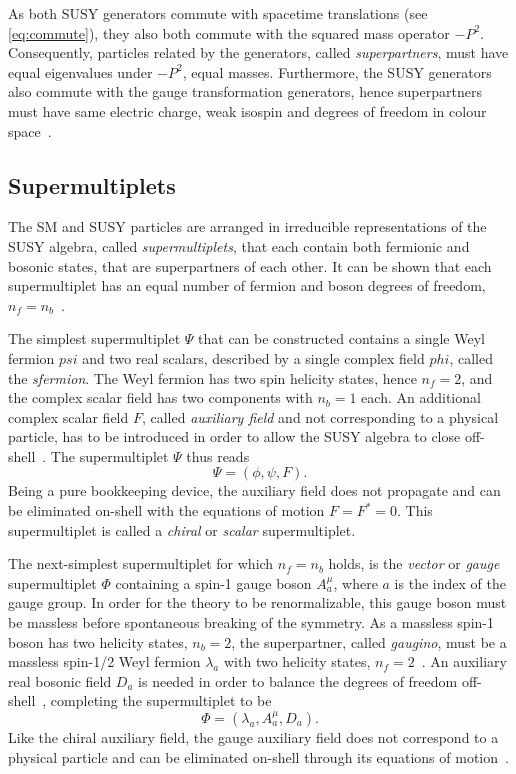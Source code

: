 As both SUSY generators commute with spacetime translations (see \cref{eq:commute}), they also both commute with the squared mass operator $-P^2$. Consequently, particles related by the generators, called \textit{superpartners}, must have equal eigenvalues under $-P^2$, \ie equal masses. Furthermore, the SUSY generators also commute with the gauge transformation generators, hence superpartners must have same electric charge, weak isospin and degrees of freedom in colour space~\cite{Martin:1997ns}.


\subsection{Supermultiplets}\label{sec:supermultiplets}

The SM and SUSY particles are arranged in irreducible representations of the SUSY algebra, called \textit{supermultiplets}, that each contain both fermionic and bosonic states, that are superpartners of each other. It can be shown that each supermultiplet has an equal number of fermion and boson degrees of freedom, $n_f = n_b$~\cite{Martin:1997ns}.

The simplest supermultiplet $\Psi$ that can be constructed contains a single Weyl fermion $psi$ and two real scalars, described by a single complex field $phi$, called the \textit{sfermion}. The Weyl fermion has two spin helicity states, hence $n_f=2$, and the complex scalar field has two components with $n_b=1$ each. An additional complex scalar field $F$, called \textit{auxiliary field} and not corresponding to a physical particle, has to be introduced in order to allow the SUSY algebra to close off-shell~\cite{Martin:1997ns}. The supermultiplet $\Psi$ thus reads
\begin{equation}
	\Psi = (\phi,\psi,F).
\end{equation}
Being a pure bookkeeping device, the auxiliary field does not propagate and can be eliminated on-shell with the equations of motion $F=F^*=0$. This supermultiplet is called a \textit{chiral} or \textit{scalar} supermultiplet. 

The next-simplest supermultiplet for which $n_f = n_b$ holds, is the \textit{vector} or \textit{gauge} supermultiplet $\Phi$ containing a spin-1 gauge boson $A^\mu_a$, where $a$ is the index of the gauge group. In order for the theory to be renormalizable, this gauge boson must be massless before spontaneous breaking of the symmetry. As a massless spin-1 boson has two helicity states, $n_b = 2$, the superpartner, called \textit{gaugino}, must be a massless spin-1/2 Weyl fermion $\lambda_a$ with two helicity states, $n_f = 2$~\cite{Martin:1997ns}. An auxiliary real bosonic field $D_a$ is needed in order to balance the degrees of freedom off-shell~\cite{Bustamante:2009us}, completing the supermultiplet to be
\begin{equation}
	\Phi = (\lambda_a,A^\mu_a,D_a).
\end{equation}
 Like the chiral auxiliary field, the gauge auxiliary field does not correspond to a physical particle and can be eliminated on-shell through its equations of motion~\cite{Martin:1997ns}.

